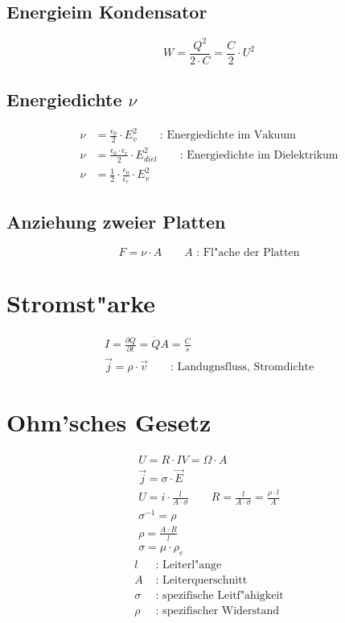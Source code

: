 \subsection{Energieim Kondensator}
\begin{equation}
	W=\frac{Q^2}{2\cdot C}=\frac{C}{2}\cdot U^2
\end{equation}

\subsection{Energiedichte $\nu$}
\begin{align}
	\nu&=\frac{\epsilon_0}{2}\cdot E_v^2\qquad\text{: Energiedichte im Vakuum} \\
	\nu&=\frac{\epsilon_0\cdot\epsilon_r}{2}\cdot E_{diel}^2\qquad\text{: Energiedichte im Dielektrikum} \\
	\nu&=\frac{1}{2}\cdot\frac{\epsilon_0}{\epsilon_r}\cdot E_v^2
\end{align}

\subsection{Anziehung zweier Platten}
\begin{equation}
	F=\nu\cdot A\qquad A\text{ : Fl"ache der Platten}
\end{equation}

\section{Stromst"arke}
\begin{gather}
	I=\frac{\partial Q}{\partial t}=\dot{Q}\unit{A=\frac{C}{s}} \\
	\overrightarrow{j}=\rho\cdot\overrightarrow{v}\qquad\text{: Landugnsfluss, Stromdichte}
\end{gather}

\section{Ohm'sches Gesetz}
\begin{gather}
	U=R\cdot I\unit{V=\Omega\cdot A} \\
	\overrightarrow{j}=\sigma\cdot\overrightarrow{E} \\
	U=i\cdot\frac{l}{A\cdot\sigma}\qquad R=\frac{l}{A\cdot\sigma}=\frac{\rho\cdot l}{A} \\
	\sigma^{-1}=\rho \\
	\rho=\frac{A\cdot R}{l} \\
	\sigma=\mu\cdot\rho_e
\end{gather}
\begin{align*}
	l&\text{ : Leiterl"ange} \\
	A&\text{ : Leiterquerschnitt} \\
	\sigma&\text{ : spezifische Leitf"ahigkeit} \\
	\rho&\text{ : spezifischer Widerstand}
\end{align*}

